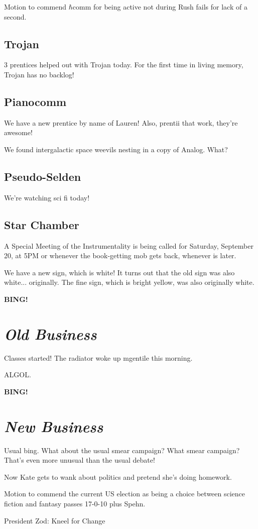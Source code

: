 \documentclass[10pt]{article}
\newcommand{\bing}{{\bf BING!} }
\newcommand{\goto}[1]{\bing \vskip 12pt \section*{{\em{#1}}}}
\newcommand{\ps}{ plus Spehn\xspace}
\begin{document}
Motion to commend $\hbar$comm for being active not during Rush fails
for lack of a second.

\subsection*{Trojan}

3 prentices helped out with Trojan today.  For the first time in
living memory, Trojan has no backlog!

\subsection*{Pianocomm}

We have a new prentice by name of Lauren!  Also, prentii that work,
they're awesome!

We found intergalactic space weevils nesting in a copy of Analog.
What?

\subsection*{Pseudo-Selden}

We're watching sci fi today!

\subsection*{Star Chamber}

A Special Meeting of the Instrumentality is being called for Saturday,
September 20, at 5PM or whenever the book-getting mob gets back,
whenever is later.

We have a new sign, which is white!  It turns out that the old sign
was also white... originally.  The fine sign, which is bright yellow,
was also originally white.

\goto{Old Business}

Classes started!  The radiator woke up mgentile this morning.

ALGOL.

\goto{New Business}

Usual bing.  What about the usual smear campaign?  What smear
campaign?  That's even more unusual than the usual debate!

Now Kate gets to wank about politics and pretend she's doing homework.

Motion to commend the current US election as being a choice between
science fiction and fantasy passes 17-0-10 \ps.

President Zod:  Kneel for Change
\end{document}
